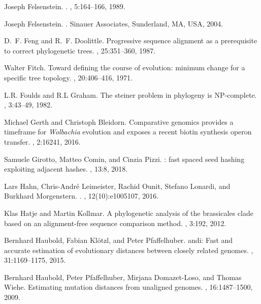 \documentclass[review]{elsarticle}
\begin{document}
{\begin{thebibliography}{10}
Joseph Felsenstein.
.
, 5:164--166, 1989.

Joseph Felsenstein.
.
\newblock Sinauer Associates, Sunderland, MA, USA, 2004.

D.~F. Feng and R.~F. Doolittle.
\newblock Progressive sequence alignment as a prerequisite to correct
  phylogenetic trees.
, 25:351--360, 1987.

Walter Fitch.
\newblock Toward defining the course of evolution: minimum change for a
  specific tree topology.
, 20:406--416, 1971.

L.R. Foulds and R.L Graham.
\newblock The steiner problem in phylogeny is {NP}-complete.
, 3:43--49, 1982.

Michael Gerth and Christoph Bleidorn.
\newblock Comparative genomics provides a timeframe for {{\em Wolbachia}}
  evolution and exposes a recent biotin synthesis operon transfer.
, 2:16241, 2016.

Samuele Girotto, Matteo Comin, and Cinzia Pizzi.
: fast spaced seed hashing exploiting adjacent hashes.
, 13:8, 2018.

Lars Hahn, Chris-Andr{\'e} Leimeister, Rachid Ounit, Stefano Lonardi, and
  Burkhard Morgenstern.
.
, 12(10):e1005107, 2016.

Klas Hatje and Martin Kollmar.
\newblock A phylogenetic analysis of the brassicales clade based on an
  alignment-free sequence comparison method.
, 3:192, 2012.

Bernhard Haubold, Fabian Kl{\"o}tzl, and Peter Pfaffelhuber.
\newblock andi: Fast and accurate estimation of evolutionary distances between
  closely related genomes.
, 31:1169--1175, 2015.

Bernhard Haubold, Peter Pfaffelhuber, Mirjana Domazet-Loso, and Thomas Wiehe.
\newblock Estimating mutation distances from unaligned genomes.
, 16:1487--1500, 2009.


\end{thebibliography}}
\end{document}
